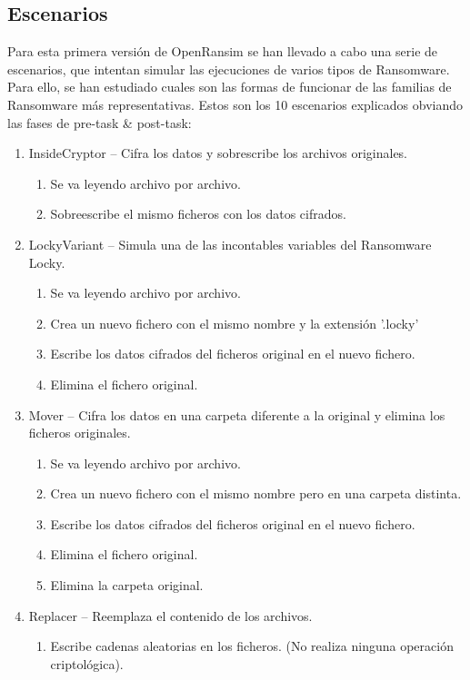 \documentclass[a4paper,12pt]{article}
\begin{document}
\subsection{Escenarios}
Para esta primera versión de OpenRansim se han llevado a cabo una serie de escenarios, que intentan simular las ejecuciones de varios tipos de Ransomware. Para ello, se han estudiado cuales son las formas de funcionar de las familias de Ransomware más representativas. Estos son los 10 escenarios explicados obviando las fases de pre-task \& post-task: 
\begin{enumerate}
\item InsideCryptor – Cifra los datos y sobrescribe los archivos originales.
\begin{enumerate}
	\item Se va leyendo archivo por archivo. 
	\item Sobreescribe el mismo ficheros con los datos cifrados.
\end{enumerate}
\item LockyVariant – Simula una de las incontables variables del Ransomware Locky.
\begin{enumerate}
	\item Se va leyendo archivo por archivo.
	\item Crea un nuevo fichero con el mismo nombre y la extensión '.locky'
	\item Escribe los datos cifrados del ficheros original en el nuevo fichero.
	\item Elimina el fichero original.
\end{enumerate}
\item Mover – Cifra los datos en una carpeta diferente a la original y elimina los ficheros originales.
\begin{enumerate}
	\item Se va leyendo archivo por archivo.
	\item Crea un nuevo fichero con el mismo nombre pero en una carpeta distinta.
	\item Escribe los datos cifrados del ficheros original en el nuevo fichero.
	\item Elimina el fichero original.
	\item Elimina la carpeta original.
\end{enumerate}
\item Replacer – Reemplaza el contenido de los archivos.
\begin{enumerate}
	\item Escribe cadenas aleatorias en los ficheros. (No realiza ninguna operación criptológica).

\end{enumerate}
\end{enumerate}
\end{document}
